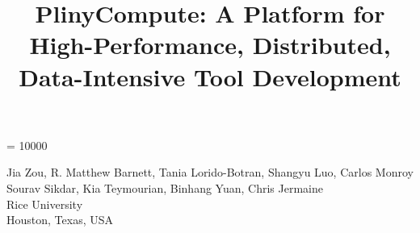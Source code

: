 \documentclass[11pt]{article}
\begin{document}
\widowpenalty = 10000

\date{\vspace{-5ex}}
\title{PlinyCompute: A Platform for High-Performance, Distributed, Data-Intensive Tool Development}
\maketitle


\begin{center} Jia Zou, R. Matthew Barnett, Tania Lorido-Botran, Shangyu Luo, Carlos Monroy \\ Sourav Sikdar, 
Kia Teymourian, Binhang Yuan, Chris Jermaine \\

\vspace{5 pt}
Rice University \\
Houston, Texas, USA
\vspace{5ex}
\end{center}

























\appendix




\end{document}
